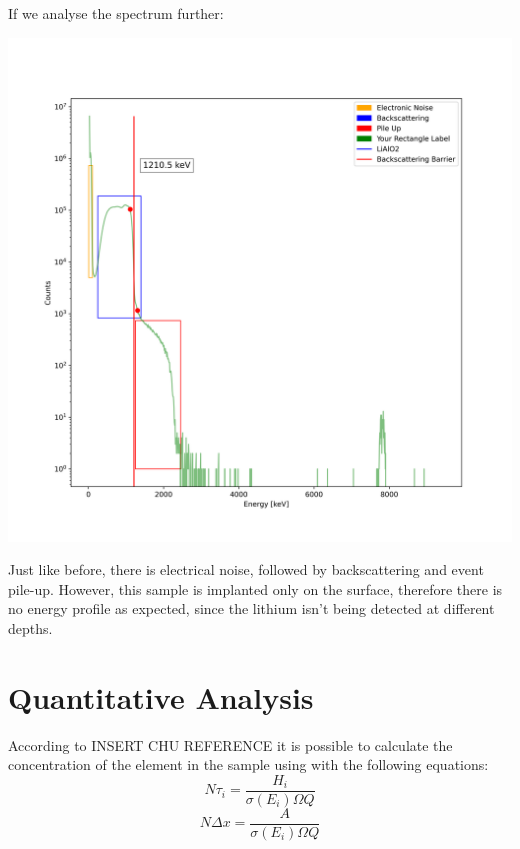 \documentclass{article}
\begin{document}
\begin{multicols}{2}
If we analyse the spectrum further:

\begin{center}
    \label{TT_21}
    \centering
    \includegraphics[scale = 0.4]{../../images/FullAnalysisImplanted.png}
\end{center}

Just like before, there is electrical noise, followed by backscattering and event pile-up.
However, this sample is implanted only on the surface, therefore there is no energy profile as expected, since the lithium isn't being detected at different depths.



\section{Quantitative Analysis}
According to INSERT CHU REFERENCE it is possible to calculate the concentration of the element in the sample using with the following equations:
\begin{equation}
    N\tau_i=\frac{H_i}{\sigma (E_i)\Omega Q}
\end{equation}
\begin{equation}
    N\Delta x=\frac{A}{\sigma (E_i)\Omega Q}
\end{equation}


\end{multicols}
\end{document}
